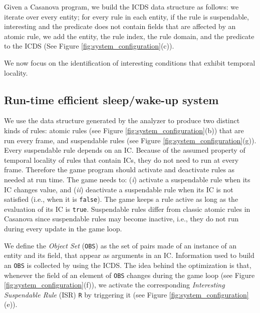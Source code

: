 Given a Casanova program, we build the ICDS data structure as follows: we iterate over every entity; for every rule in each entity, if the rule is suspendable, interesting and the predicate does not contain fields that are affected by an atomic rule, we add the entity, the rule index, the rule domain, and the predicate to the ICDS (See Figure \ref{fig:system_configuration}(c)).

We now focus on the identification of interesting conditions that exhibit temporal locality.

\subsection{Run-time efficient sleep/wake-up system}

We use the data structure generated by the analyzer to produce two distinct kinds of rules: atomic rules (see Figure \ref{fig:system_configuration}(b)) that are run every frame, and suspendable rules (see Figure \ref{fig:system_configuration}(g)). Every suspendable rule depends on an IC. %
Because of the assumed property of temporal locality of rules that contain ICs, they do not need to run at every frame. Therefore the game program should activate and deactivate rules as needed at run time. The game needs to: (\textit{i}) activate a suspendable rule when its IC changes value, and (\textit{ii}) deactivate a suspendable rule when its IC is not satisfied (i.e., when it is \texttt{false}). The game keeps a rule active as long as the evaluation of its IC is \texttt{true}. Suspendable rules differ from classic atomic rules in Casanova since suspendable rules may become inactive, i.e., they do not run during every update in the game loop.

We define the \emph{Object Set} (\texttt{OBS}) as the set of pairs made of an instance of an entity and its field, that appear as arguments in an IC. Information used to build an \texttt{OBS} is collected by using the ICDS. The idea behind the optimization is that, whenever the field of an element of \texttt{OBS} changes during the game loop (see Figure \ref{fig:system_configuration}(f)), we activate the corresponding \emph{Interesting Suspendable Rule} (ISR) \texttt{R} by triggering it (see Figure \ref{fig:system_configuration}(e)).


